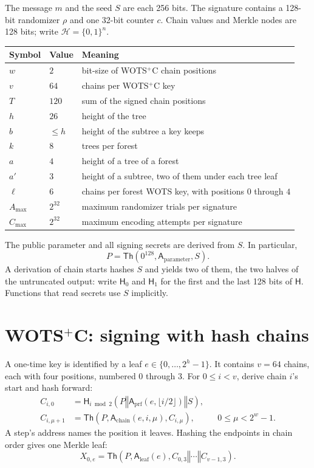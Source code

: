 \documentclass[11pt]{article}
\theoremstyle{plain}
\theoremstyle{definition}
\newcommand{\bits}[1]{\{0,1\}^{#1}}
\newcommand{\Th}{\mathsf{Th}}
\newcommand{\hash}{\mathsf{H}}
\newcommand{\concat}{\mathbin\Vert}
\newcommand{\addr}{\mathsf{A}}
\newcommand{\amax}{A_{\max}}
\newcommand{\cmax}{C_{\max}}
\begin{document}
The message $m$ and the seed $S$ are each 256 bits. The signature contains a 128-bit randomizer $\rho$ and one 32-bit counter $c$. Chain values and Merkle nodes are 128 bits; write $\mathcal H=\bits n$.

\begin{center}
\begin{tabular}{@{}lll@{}}
\toprule
Symbol & Value & Meaning\\
\midrule
$w$ & $2$ & bit-size of WOTS$^+$C chain positions\\
$v$ & $64$ & chains per WOTS$^+$C key\\
$T$ & $120$ & sum of the signed chain positions\\
$h$ & $26$ & height of the tree\\
$b$ & $\leq h$ & height of the subtree a key keeps\\
$k$ & $8$ & trees per forest\\
$a$ & $4$ & height of a tree of a forest\\
$a'$ & $3$ & height of a subtree, two of them under each tree leaf\\
$\ell$ & $6$ & chains per forest WOTS key, with positions $0$ through $4$\\
$\amax$ & $2^{32}$ & maximum randomizer trials per signature\\
$\cmax$ & $2^{32}$ & maximum encoding attempts per signature\\
\bottomrule
\end{tabular}
\end{center}

The public parameter and all signing secrets are derived from $S$. In particular,
\[
  P=\Th\!\left(0^{128},\addr_{\mathrm{parameter}},S\right).
\]
A derivation of chain starts hashes $S$ and yields two of them, the two halves of the untruncated output: write $\hash_0$ and $\hash_1$ for the first and the last 128 bits of $\hash$. Functions that read secrets use $S$ implicitly.

\section{\texorpdfstring{WOTS$^+$C}{WOTS+C}: signing with hash chains}
\label{sec:ots}

A one-time key is identified by a leaf $e\in\{0,\ldots,2^h-1\}$. It contains $v=64$ chains, each with four positions, numbered $0$ through $3$. For $0\leq i<v$, derive chain $i$'s start and hash forward:
\[
\begin{aligned}
  C_{i,0}&=\hash_{i\bmod2}\!\left(P\concat\addr_{\mathrm{prf}}(e,\lfloor i/2\rfloor)\concat S\right),\\
  C_{i,\mu+1}&=\Th\!\left(P,\addr_{\mathrm{chain}}(e,i,\mu),C_{i,\mu}\right),
    &&0\leq\mu<2^w-1.
\end{aligned}
\]
A step's address names the position it leaves. Hashing the endpoints in chain order gives one Merkle leaf:
\[
  X_{0,e}=\Th\!\left(P,\addr_{\mathrm{leaf}}(e),C_{0,3}\concat\cdots\concat C_{v-1,3}\right).
\]
\end{document}
